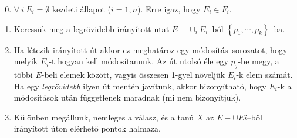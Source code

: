 \begin{enumerate}
    \setcounter{enumi}{-1}
    \item $\forall~i~E_i = \emptyset$ kezdeti állapot ($i=\overline{1,n}$). Erre
    igaz, hogy $E_i \in F_i$.
    \item Keressük meg a legrövidebb irányított utat $E-\cup_{i}E_i$--ból
    $\left\{ p_1, \cdots, p_k \right\}$--ba.

    \item Ha létezik irányított út akkor ez meghatároz egy módosítás--sorozatot,
    hogy melyik $E_i$-t hogyan kell módosítanunk. Az út utolsó éle egy $p_j$-be
    megy, a többi $E$-beli elemek között, vagyis összesen 1-gyel növeljük
    $E_i$-k elem számát.  Ha egy {\it legrövidebb} ilyen út mentén javítunk,
    akkor bizonyítható, hogy $E_i$-k a módosítások után függetlenek maradnak (mi
    nem bizonyítjuk).
    \item Különben megállunk, nemleges a válasz, és a tanú $X$ az $E- \cup Ei$--ből
    irányított úton elérhető pontok halmaza.
\end{enumerate}

